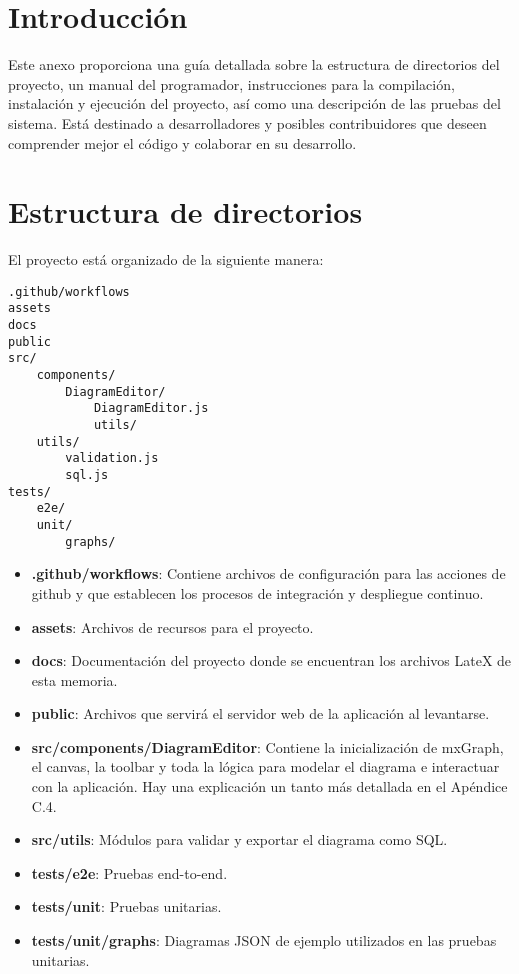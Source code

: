 
\section{Introducción}
Este anexo proporciona una guía detallada sobre la estructura de directorios del proyecto, un manual del programador, instrucciones para la compilación, instalación y ejecución del proyecto, así como una descripción de las pruebas del sistema. Está destinado a desarrolladores y posibles contribuidores que deseen comprender mejor el código y colaborar en su desarrollo.

\section{Estructura de directorios}
El proyecto está organizado de la siguiente manera:

\begin{verbatim}
.github/workflows
assets
docs
public
src/
    components/
        DiagramEditor/
            DiagramEditor.js
            utils/
    utils/
        validation.js
        sql.js
tests/
    e2e/
    unit/
        graphs/
\end{verbatim}

\begin{itemize}
    \item \textbf{.github/workflows}: Contiene archivos de configuración para las acciones de github y que establecen los procesos de integración y despliegue continuo.
    \item \textbf{assets}: Archivos de recursos para el proyecto.
    \item \textbf{docs}: Documentación del proyecto donde se encuentran los archivos LateX de esta memoria.
    \item \textbf{public}: Archivos que servirá el servidor web de la aplicación al levantarse.
    \item \textbf{src/components/DiagramEditor}: Contiene la inicialización de mxGraph, el canvas, la toolbar y toda la lógica para modelar el diagrama e interactuar con la aplicación. Hay una explicación un tanto más detallada en el Apéndice C.4.
    \item \textbf{src/utils}: Módulos para validar y exportar el diagrama como SQL.
    \item \textbf{tests/e2e}: Pruebas end-to-end.
    \item \textbf{tests/unit}: Pruebas unitarias.
    \item \textbf{tests/unit/graphs}: Diagramas JSON de ejemplo utilizados en las pruebas unitarias.
\end{itemize}


